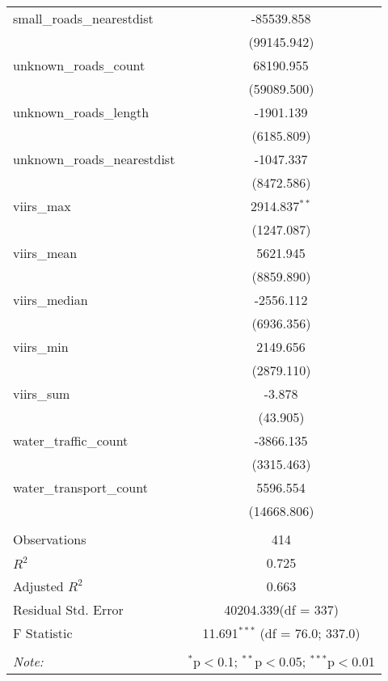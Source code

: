 \begin{table}[!htbp]
\begin{tabular}{@{\extracolsep{5pt}}lc}
 small_roads_nearestdist & -85539.858$^{}$ \\
  & (99145.942) \\
 unknown_roads_count & 68190.955$^{}$ \\
  & (59089.500) \\
 unknown_roads_length & -1901.139$^{}$ \\
  & (6185.809) \\
 unknown_roads_nearestdist & -1047.337$^{}$ \\
  & (8472.586) \\
 viirs_max & 2914.837$^{**}$ \\
  & (1247.087) \\
 viirs_mean & 5621.945$^{}$ \\
  & (8859.890) \\
 viirs_median & -2556.112$^{}$ \\
  & (6936.356) \\
 viirs_min & 2149.656$^{}$ \\
  & (2879.110) \\
 viirs_sum & -3.878$^{}$ \\
  & (43.905) \\
 water_traffic_count & -3866.135$^{}$ \\
  & (3315.463) \\
 water_transport_count & 5596.554$^{}$ \\
  & (14668.806) \\
\hline \\[-1.8ex]
 Observations & 414 \\
 $R^2$ & 0.725 \\
 Adjusted $R^2$ & 0.663 \\
 Residual Std. Error & 40204.339(df = 337)  \\
 F Statistic & 11.691$^{***}$ (df = 76.0; 337.0) \\
\hline
\hline \\[-1.8ex]
\textit{Note:} & \multicolumn{1}{r}{$^{*}$p$<$0.1; $^{**}$p$<$0.05; $^{***}$p$<$0.01} \\
\end{tabular}
\end{table}